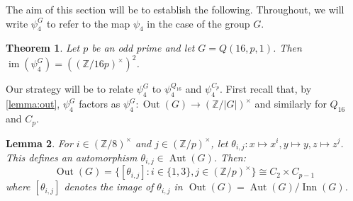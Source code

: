 \documentclass[11pt,leqno,a4paper]{amsart}
\newcommand{\Z}{\mathbb{Z}}
\DeclareMathOperator{\Aut}{Aut}
\DeclareMathOperator{\IM}{im}
\DeclareMathOperator{\Inn}{Inn}
\DeclareMathOperator{\Out}{Out}
\newtheorem{thm}{Theorem}[section]
\newtheorem{lemma}[thm]{Lemma}
\theoremstyle{definition}
\theoremstyle{remark}
\theoremstyle{custom}
\begin{document}
The aim of this section will be to establish the following. Throughout, we will write $\psi_4^G$ to refer to the map $\psi_4$ in the case of the group $G$.

\begin{thm} \label{thm:image-psi-4}
Let $p$ be an odd prime and let $G = Q(16,p,1)$. Then $\IM(\psi_4^G) = ((\Z/16p)^\times)^2$. 
\end{thm}

Our strategy will be to relate $\psi_4^G$ to $\psi_4^{Q_{16}}$ and $\psi_4^{C_p}$.
First recall that, by \cref{lemma:out}, $\psi_4^G$ factors as $\psi_4^G : \Out(G) \to (\Z/|G|)^\times$ and similarly for $Q_{16}$ and $C_p$.

\begin{lemma} \label{lemma:Out(G)}
For $i \in (\Z/8)^\times$ and $j \in (\Z/p)^\times$, let $\theta_{i,j} : x \mapsto x^i, y \mapsto y, z \mapsto z^j$. This defines an automorphism $\theta_{i,j} \in \Aut(G)$. Then:
\[ \Out(G) = \{ [\theta_{i,j}] : i \in \{1,3\}, j \in (\Z/p)^\times\} \cong C_2 \times C_{p-1} \]
where $[\theta_{i,j}]$ denotes the image of $\theta_{i,j}$ in $\Out(G) = \Aut(G)/{\Inn(G)}$.
\end{lemma}
\end{document}
